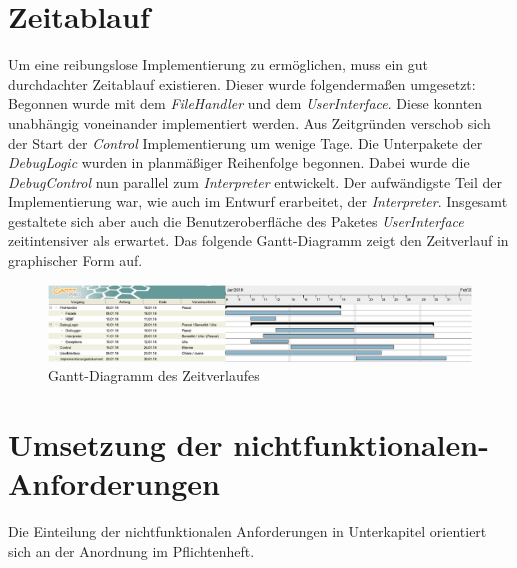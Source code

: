 \documentclass[parskip=full]{scrartcl}
\begin{document}
\section{Zeitablauf}
Um eine reibungslose Implementierung zu ermöglichen, muss ein gut durchdachter Zeitablauf existieren.
Dieser wurde folgendermaßen umgesetzt:\\
Begonnen wurde mit dem \textit{FileHandler} und dem \textit{UserInterface}. Diese konnten unabhängig voneinander implementiert werden.
Aus Zeitgründen verschob sich der Start der \textit{Control} Implementierung um wenige Tage.
Die Unterpakete der \textit{DebugLogic} wurden in planmäßiger Reihenfolge begonnen. Dabei wurde die \textit{DebugControl} nun parallel zum \textit{Interpreter} entwickelt.
Der aufwändigste Teil der Implementierung war, wie auch im Entwurf erarbeitet, der \textit{Interpreter}. Insgesamt gestaltete sich aber auch die Benutzeroberfläche des Paketes \textit{UserInterface} zeitintensiver als erwartet.
Das folgende Gantt-Diagramm zeigt den Zeitverlauf in graphischer Form auf.
\begin{figure}[!h]
\centering
\includegraphics[width=1.0\textwidth]{ganntDiagramm_neu_crop.pdf}
\caption{Gantt-Diagramm des Zeitverlaufes}
\end{figure}

\section{Umsetzung der nichtfunktionalen-Anforderungen}

Die Einteilung der nichtfunktionalen Anforderungen in Unterkapitel orientiert sich an der Anordnung im Pflichtenheft.
\end{document}
